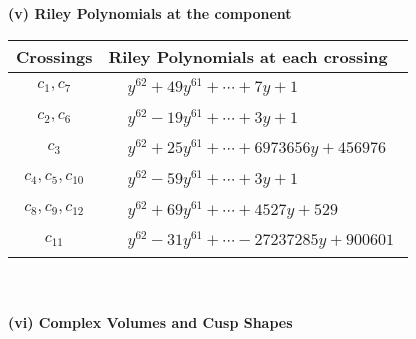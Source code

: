 \documentclass[1p]{elsarticle_modified}
\theoremstyle{definition}
\begin{document}
\newpage\renewcommand{\arraystretch}{1}
\flushleft \textbf{(v) Riley Polynomials at the component}\newline \\
\begin{tabular}{m{50pt}|m{274pt}}
Crossings & \hspace{64pt}Riley Polynomials at each crossing \\
\hline $$\begin{aligned}c_{1},c_{7}\end{aligned}$$&$\begin{aligned}
&y^{62}+49 y^{61}+\cdots+7 y+1
\end{aligned}$\\
\hline $$\begin{aligned}c_{2},c_{6}\end{aligned}$$&$\begin{aligned}
&y^{62}-19 y^{61}+\cdots+3 y+1
\end{aligned}$\\
\hline $$\begin{aligned}c_{3}\end{aligned}$$&$\begin{aligned}
&y^{62}+25 y^{61}+\cdots+6973656 y+456976
\end{aligned}$\\
\hline $$\begin{aligned}c_{4},c_{5},c_{10}\end{aligned}$$&$\begin{aligned}
&y^{62}-59 y^{61}+\cdots+3 y+1
\end{aligned}$\\
\hline $$\begin{aligned}c_{8},c_{9},c_{12}\end{aligned}$$&$\begin{aligned}
&y^{62}+69 y^{61}+\cdots+4527 y+529
\end{aligned}$\\
\hline $$\begin{aligned}c_{11}\end{aligned}$$&$\begin{aligned}
&y^{62}-31 y^{61}+\cdots-27237285 y+900601
\end{aligned}$\\
\hline
\end{tabular}\\~\\
\newpage\flushleft \textbf{(vi) Complex Volumes and Cusp Shapes}
\end{document}
